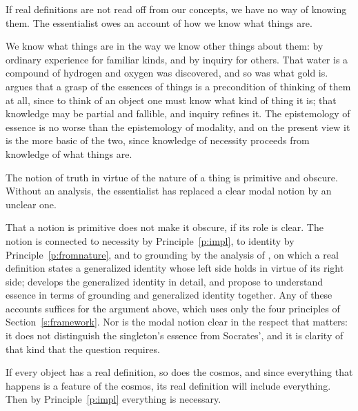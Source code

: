 \documentclass{situationist-preprint}
\begin{document}
\begin{objection}[Epistemology]\label{o:epist}
If real definitions are not read off from our concepts, we have no way of knowing them. The essentialist owes an account of how we know what things are.
\end{objection}

\begin{reply}
We know what things are in the way we know other things about them: by ordinary experience for familiar kinds, and by inquiry for others. That water is a compound of hydrogen and oxygen was discovered, and so was what gold is. \citet{Lowe2012} argues that a grasp of the essences of things is a precondition of thinking of them at all, since to think of an object one must know what kind of thing it is; that knowledge may be partial and fallible, and inquiry refines it. The epistemology of essence is no worse than the epistemology of modality, and on the present view it is the more basic of the two, since knowledge of necessity proceeds from knowledge of what things are.
\end{reply}

\begin{objection}[Obscurity]\label{o:obscure}
The notion of truth in virtue of the nature of a thing is primitive and obscure. Without an analysis, the essentialist has replaced a clear modal notion by an unclear one.
\end{objection}

\begin{reply}
That a notion is primitive does not make it obscure, if its role is clear. The notion is connected to necessity by Principle~\ref{p:impl}, to identity by Principle~\ref{p:fromnature}, and to grounding by the analysis of \citet{Rosen2015}, on which a real definition states a generalized identity whose left side holds in virtue of its right side; \citet{Dorr2016} develops the generalized identity in detail, and \citet{CorreiaSkiles2019} propose to understand essence in terms of grounding and generalized identity together. Any of these accounts suffices for the argument above, which uses only the four principles of Section~\ref{s:framework}. Nor is the modal notion clear in the respect that matters: it does not distinguish the singleton's essence from Socrates', and it is clarity of that kind that the question requires.
\end{reply}

\begin{objection}[Collapse]\label{o:collapse}
If every object has a real definition, so does the cosmos, and since everything that happens is a feature of the cosmos, its real definition will include everything. Then by Principle~\ref{p:impl} everything is necessary.
\end{objection}
\end{document}

